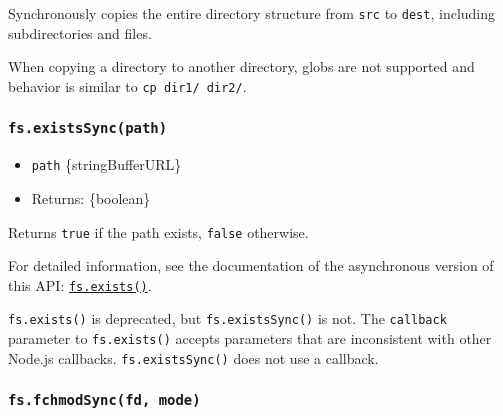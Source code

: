 Synchronously copies the entire directory structure from \texttt{src} to
\texttt{dest}, including subdirectories and files.

When copying a directory to another directory, globs are not supported
and behavior is similar to \texttt{cp\ dir1/\ dir2/}.

\subsubsection{\texorpdfstring{\texttt{fs.existsSync(path)}}{fs.existsSync(path)}}\label{fs.existssyncpath}

\begin{itemize}
\tightlist
\item
  \texttt{path} \{string\textbar Buffer\textbar URL\}
\item
  Returns: \{boolean\}
\end{itemize}

Returns \texttt{true} if the path exists, \texttt{false} otherwise.

For detailed information, see the documentation of the asynchronous
version of this API:
\hyperref[fsexistspath-callback]{\texttt{fs.exists()}}.

\texttt{fs.exists()} is deprecated, but \texttt{fs.existsSync()} is not.
The \texttt{callback} parameter to \texttt{fs.exists()} accepts
parameters that are inconsistent with other Node.js callbacks.
\texttt{fs.existsSync()} does not use a callback.

\begin{Shaded}
\begin{Highlighting}[]
 \OperatorTok{;}

\NormalTok{ (}\NormalTok{(}\NormalTok{))}
  \NormalTok{(}\NormalTok{)}\OperatorTok{;}
\end{Highlighting}
\end{Shaded}

\subsubsection{\texorpdfstring{\texttt{fs.fchmodSync(fd,\ mode)}}{fs.fchmodSync(fd, mode)}}\label{fs.fchmodsyncfd-mode}

